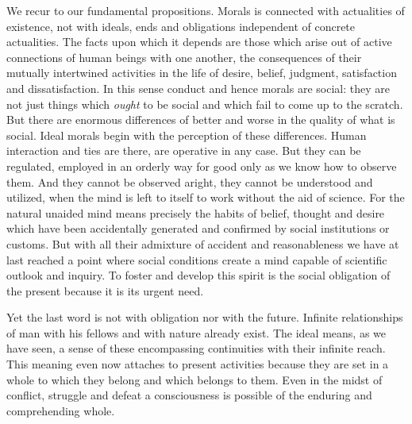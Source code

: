 We recur to our fundamental propositions. Morals is connected with
actualities of existence, not with ideals, ends and obligations
independent of concrete actualities. The facts upon which it depends
are those which arise out of active connections of human beings with
one another, the consequences of their mutually intertwined activities
in the life of desire, belief, judgment, satisfaction and
dissatisfaction. In this sense conduct and hence morals are social:
they are not just things which \textit{ought} to be social and which
fail to come up to the scratch. But there are enormous differences of
better and worse in the quality of what is social. Ideal morals begin
with the perception of these differences. Human interaction and ties
are there, are operative in any case. But they can be regulated,
employed in an orderly way for good only as we know how to observe
them. And they cannot be observed aright, they cannot be understood
and utilized, when the mind is left to itself to work without the aid
of science. For the natural unaided mind means precisely the habits of
belief, thought and desire which have been accidentally generated and
confirmed by social institutions or customs. But with all their
admixture of accident and reasonableness we have at last reached a
point where social conditions create a mind capable of scientific
outlook and inquiry. To foster and develop this spirit is the social
obligation of the present because it is its urgent need.

Yet the last word is not with obligation nor with the
future. Infinite relationships of man with his fellows and with nature
already exist. The ideal means, as we have seen, a sense of these
encompassing continuities with their infinite reach. This meaning even
now attaches to present activities because they are set in a whole to
which they belong and which belongs to them. Even in the midst of
conflict, struggle and defeat a consciousness is possible of the
enduring and comprehending whole.

